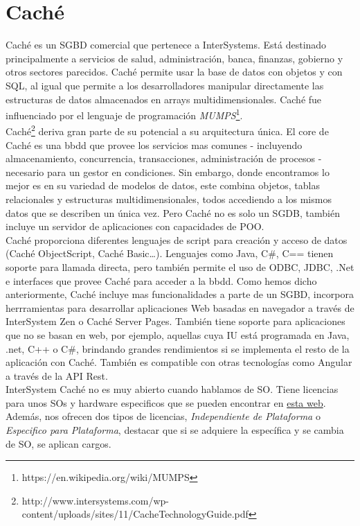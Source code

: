 \documentclass{article}
\begin{document}
\section{Caché}
Caché es un SGBD comercial que pertenece a InterSystems. Está destinado principalmente a servicios de salud, administración, banca, finanzas, gobierno y otros sectores parecidos. Caché permite usar la base de datos con objetos y con SQL, al igual que permite a los desarrolladores manipular directamente las estructuras de datos almacenados en arrays multidimensionales. Caché fue influenciado por el lenguaje de programación \textit{MUMPS}\footnote{https://en.wikipedia.org/wiki/MUMPS}.\cite{wikiCache}\\

Caché\footnote{http://www.intersystems.com/wp-content/uploads/sites/11/CacheTechnologyGuide.pdf} deriva gran parte de su potencial a su arquitectura única. El core de Caché es una bbdd que provee los servicios mas comunes - incluyendo almacenamiento, concurrencia, transacciones, administración de procesos - necesario para un gestor en condiciones. Sin embargo, donde encontramos lo mejor es en su variedad de modelos de datos, este combina objetos, tablas relacionales y estructuras multidimensionales, todos accediendo a los mismos datos que se describen un única vez. Pero Caché no es solo un SGDB, también incluye un servidor de aplicaciones con capacidades de POO.  \\
Caché proporciona diferentes lenguajes de script para creación y acceso de datos (Caché ObjectScript, Caché Basic…). Lenguajes como Java, C\#, C== tienen soporte para llamada directa, pero también permite el uso de ODBC, JDBC, .Net e interfaces que provee Caché para acceder a la bbdd. Como hemos dicho anteriormente, Caché incluye mas funcionalidades a parte de un SGBD, incorpora herrramientas para desarrollar aplicaciones Web basadas en navegador a través de InterSystem Zen o Caché Server Pages. También tiene soporte para aplicaciones que no se basan en web, por ejemplo, aquellas cuya IU está programada en Java, .net, C++ o C\#, brindando grandes rendimientos si se implementa el resto de la aplicación con Caché. También es compatible con otras tecnologías como Angular a través de la API Rest.\\

InterSystem Caché no es muy abierto cuando hablamos de SO. Tiene licencias para unos SOs y hardware especificos que se pueden encontrar en \href{https://www.intersystems.com/support-learning/support/cache-licensing-platforms/}{esta web}. Además, nos ofrecen dos tipos de licencias, \textit{Independiente de Plataforma} o \textit{Especifico para Plataforma}, destacar que si se adquiere la específica y se cambia de SO, se aplican cargos. \\
\end{document}
